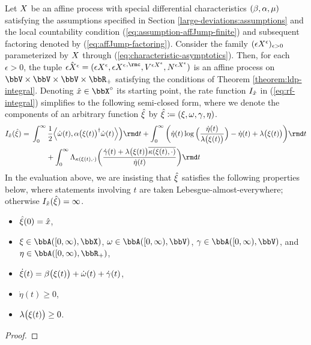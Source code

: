 \begin{theorem}
  \label{eq:ldp-closed-form}
  Let $X$ be an affine process with special differential characteristics $(\beta, \alpha, \mu)$ satisfying the assumptions specified in Section \ref{large-deviations:assumptions} and the local countability condition (\ref{eq:assumption-affJump-finite}) and subsequent factoring denoted by (\ref{eq:affJump-factoring}).
  Consider the family $(\epsilon X^\epsilon)_{\epsilon>0}$ parameterized by $X$ through (\ref{eq:characteristic-asymptotics}).
  Then, for each $\epsilon > 0$, the tuple $\hat\Xe = (\Xe, {\Xe}^{,\rmc}, \V^{\Xe}, \N^{\Xe})$ is an affine process on $\vecSpace \times \vecSpace \times \vecSpace \times \bbR_+$ satisfying the conditions of Theorem \ref{theorem:ldp-integral}.
  Denoting $\hat\stateVar\in \stateSpace^\circ$ its starting point, the rate function $I_{\hat{x}}$ in (\ref{eq:rf-integral}) simplifies to the following semi-closed form, where we denote the components of an arbitrary function $\hat{\xi}$ by $\hat{\xi} \coloneqq (\xi, \omega, \gamma, \eta)$.
  \begin{equation*}
    \rf_{\hat\stateVar}(\hat\pathVar) = 
    \begin{aligned}[t]
      &\int_0^\infty \frac12 \Bprj{\dot\omega(t)}{\affDiff\big(\pathVar(t)\big)^\dagger \dot\omega(t)} \Big) \rmd t 
      + \int_0^\infty \bigg( \dot\eta(t)\log\Big(\frac{\dot\eta(t)}{\affInt\big(\pathVar(t)\big)} \Big) - \dot\eta(t) + \affInt\big(\pathVar(t)\big) \bigg) \rmd t  \\
      &\qquad+ \int_0^\infty \ode_{\affDist(\pathVar(t),\cdot)}\bigg( \frac{\dot\gamma(t) + \affInt\big(\pathVar(t)\big)\overline{\affDist(\pathVar(t), \cdot)}}{\dot\eta(t)} \bigg) \rmd t
    \end{aligned}
  \end{equation*}
  In the evaluation above, we are insisting that $\hat{\xi}$ satisfies the following properties below, where statements involving $t$ are taken Lebesgue-almost-everywhere; otherwise $I_{\hat{x}}(\hat{\xi}) = \infty$.
  \begin{itemize}
    \item
      $\hat{\xi}(0) = \hat{x}$,
    \item
      $\pathVar \in \acpathSpace{[0,\infty)}{\stateSpace}$, $\omega \in \acpathSpace{[0,\infty)}{\vecSpace}$, $\gamma \in \acpathSpace{[0,\infty)}{\vecSpace}$, and $\eta \in \acpathSpace{[0,\infty)}{\bbR_+}$,
    \item
      $\dot{\xi}(t) = \beta\big(\xi(t)\big) + \dot\omega(t) + \dot\gamma(t)$,
    \item
      $\dot\eta(t) \geq 0$,
    \item
      $\lambda\big(\xi(t)\big) \geq 0$.
  \end{itemize}
\end{theorem}
\begin{proof}
\end{proof}
